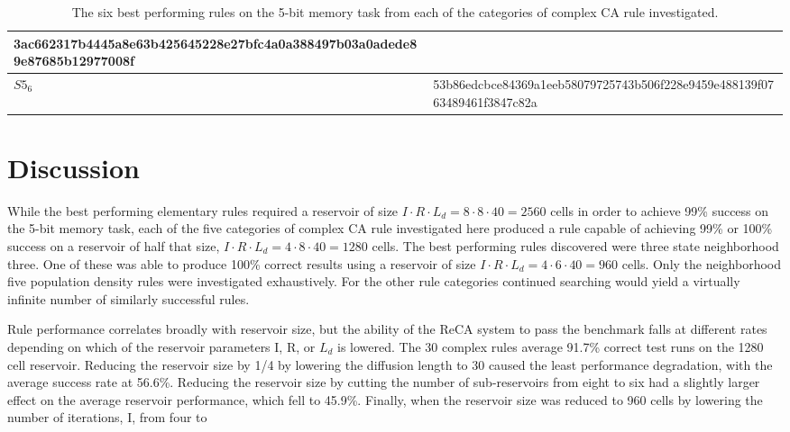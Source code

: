 \documentclass{elsarticle}
\begin{document}
\begin{multicols}{2}
\begin{table}[!htb]
\begin{tabular}{|p{2cm}|l|}
3ac662317b4445a8e63b425645228e27bfc4a0a388497b03a0adede89e87685b12977008f
\\ \hline
$S5_{6}$ & %
53b86edcbce84369a1eeb58079725743b506f228e9459e488139f0763489461f3847c82a
\\ \hline
\end{tabular}
\caption{The six best performing rules on the 5-bit memory task from each of 
   the categories of complex CA rule investigated.}
\label{table:rules_temp_dens}
\end{table}

\section{Discussion}\label{discussion}
While the best performing elementary rules required a reservoir of size $I \cdot R 
\cdot L_{d} = 8 \cdot 8 \cdot 40 = 2560$ cells in order to achieve 99\% success on the 
5-bit memory task, each of the five categories of complex CA rule investigated 
here produced a rule capable of achieving 99\% or 100\% success on a reservoir 
of half that size, $I \cdot R \cdot L_{d} = 4 \cdot 8 \cdot 40 = 1280$ cells. The best 
performing rules discovered were three state neighborhood three. One of these 
was able to produce 100\% correct results using a reservoir of size $I \cdot R \cdot 
L_{d} = 4 \cdot 6 \cdot 40 = 960$ cells. Only the neighborhood five population density 
rules were investigated exhaustively.  For the other rule categories continued 
searching would yield a virtually infinite number of similarly successful 
rules. \par Rule performance correlates broadly with reservoir size, but the 
ability of the ReCA system to  pass the benchmark falls at different rates 
depending on which of the reservoir parameters I, R, or $L_{d}$ is lowered. The 
30 complex rules average 91.7\% correct test runs on the 1280 cell reservoir.  
Reducing the reservoir size by 1/4 by lowering the diffusion length to 30 
caused the least performance degradation, with the average success rate at 
56.6\%. Reducing the reservoir size by cutting the number of sub-reservoirs 
from eight to six had a slightly larger effect on the average reservoir 
performance, which fell to 45.9\%.  Finally, when the reservoir size was 
reduced to 960 cells by lowering the number of iterations, I, from four to 

\end{multicols}
\end{document}
